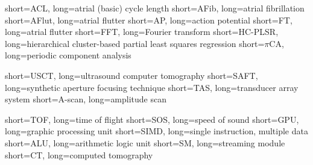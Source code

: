 \usepackage{enumitem}
\newlength\myitemwidth
\setlength\myitemwidth{9em} 						%












  		{short={ACL},		long={atrial (basic) cycle length}}
  		{short={AFib},		long={atrial fibrillation}}
  		{short={AFlut},		long={atrial flutter}}
  		{short={AP},			long={action potential}}
  		{short={FT},			long={atrial flutter}}
  		{short={FFT},		long={Fourier transform}}
  	{short={HC-PLSR},	long={hierarchical cluster-based partial least squares regression}}
  		{short={$\pi$CA},	long={periodic component analysis}}
  
		{short={USCT},	long={ultrasound computer tomography}}
		{short={SAFT},	long={synthetic aperture focusing technique}}
		{short={TAS},	long={transducer array system}}
		{short={A-scan},	long={amplitude scan}}

		{short={TOF},	long={time of flight}}
		{short={SOS},	long={speed of sound}}
        {short={GPU},	long={graphic processing unit}}
        {short={SIMD},	long={single instruction, multiple data}}
        {short={ALU},	long={arithmetic logic unit}}
        {short={SM},	long={streaming module}}
        {short={CT},	long={computed tomography}}

